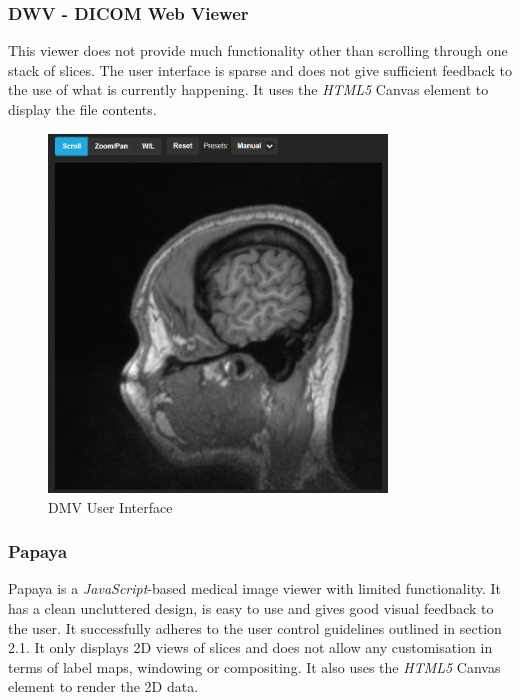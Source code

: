 \documentclass[a4paper,11pt,twoside]{article}
\begin{document}
\subsubsection{DWV - DICOM Web Viewer}
This viewer does not provide much functionality other than scrolling through one stack of slices. The user interface is sparse and does not give sufficient feedback to the use of what is currently happening. It uses the \textit{HTML5} Canvas element to display the file contents.

\begin{figure}[ht!]
\centering
\includegraphics[width=90mm]{..//literatureSurvey/graphics/webViewer_01.png}
\caption{DMV User Interface}
\label{fig:UIdesign1}
\end{figure}



\subsubsection{Papaya}
Papaya\cite{papaya} is a \textit{JavaScript}-based medical image viewer with limited functionality. It has a clean uncluttered design, is easy to use and gives good visual feedback to the user. It successfully adheres to the user control guidelines outlined in section 2.1. It only displays 2D views of slices and does not allow any customisation in terms of label maps, windowing or compositing. It also uses the \textit{HTML5} Canvas element to render the 2D data.
\end{document}
